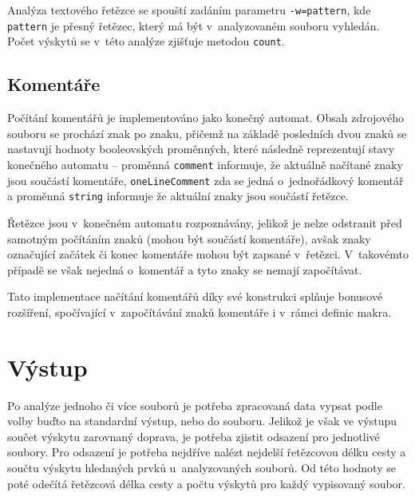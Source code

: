 \documentclass[10pt,a4paper,final]{article}
\begin{document}
      Analýza textového řetězce se spouští zadáním parametru
      \texttt{-w=pattern}, kde \texttt{pattern} je přesný řetězec, který má být
      v~analyzovaném souboru vyhledán. Počet výskytů se v~této analýze zjišťuje
      metodou \texttt{count}.

    \subsection{Komentáře} \label{komentare}

      Počítání komentářů je implementováno jako konečný automat. Obsah
      zdrojového souboru se prochází znak po znaku, přičemž na základě
      posledních dvou znaků se nastavují hodnoty booleovských proměnných, které
      následně reprezentují stavy konečného automatu -- proměnná
      \texttt{comment} informuje, že aktuálně načítané znaky jsou součástí
      komentáře, \texttt{oneLineComment} zda se jedná o~jednořádkový komentář a
      proměnná \texttt{string} informuje že aktuální znaky jsou součástí
      řetězce.

      Řetězce jsou v~konečném automatu rozpoznávány, jelikož je nelze odstranit
      před samotným počítáním znaků (mohou být součástí komentáře), avšak znaky
      označující začátek či konec komentáře mohou být zapsané v~řetězci.
      V~takovémto případě se však nejedná o~komentář a tyto znaky se nemají
      započítávat.

      Tato implementace načítání komentářů díky své konstrukci splňuje bonusové
      rozšíření, spočívající v~započítávání znaků komentáře i v~rámci definic
      makra.

  \section{Výstup} \label{vystup}

    Po analýze jednoho či více souborů je potřeba zpracovaná data vypsat podle 
    volby buďto na standardní výstup, nebo do souboru. Jelikož je však ve 
    výstupu součet výskytu zarovnaný doprava, je potřeba zjistit odsazení pro 
    jednotlivé soubory. Pro odsazení je potřeba nejdříve nalézt nejdelší
    řetězcovou délku cesty a součtu výskytu hledaných prvků u~analyzovaných
    souborů. Od této hodnoty se poté odečítá řetězcová délka cesty a počtu
    výskytů pro každý vypisovaný soubor.

    
\end{document}
